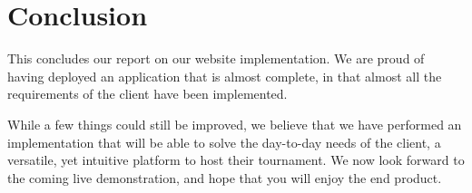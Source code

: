 \section{Conclusion}
\label{sec:Conclusion}


This concludes our report on our website implementation. We are proud of 
having deployed an application that is almost complete, in that almost all 
the requirements of the client have been implemented. \newline

While a few things could still be improved, we believe that we have performed
an implementation that will be able to solve the day-to-day needs of the
client, a versatile, yet intuitive platform to host their
tournament. We now look forward to the coming live demonstration, and hope that
you will enjoy the end product.